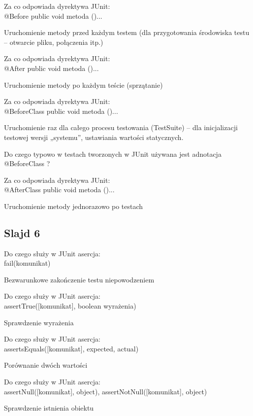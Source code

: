 \documentclass[a4paper,15pt]{article}
\newcommand{\question}[2]{
    \begin{tcolorbox}[colback=mRed!5!white,colframe=mRed,title={Kolokwium 2018 #1}]
        #2
    \end{tcolorbox}
}
\begin{document}
\begin{framed}
Za co odpowiada dyrektywa JUnit: \\
@Before public void metoda ()...
\end{framed}
Uruchomienie metody przed każdym testem (dla przygotowania środowiska testu – otwarcie pliku, połączenia itp.)

\begin{framed}
Za co odpowiada dyrektywa JUnit: \\
@After public void metoda ()...
\end{framed}
Uruchomienie metody po każdym teście (sprzątanie)


\begin{framed}
Za co odpowiada dyrektywa JUnit: \\
@BeforeClass public void metoda ()...
\end{framed}
Uruchomienie raz dla całego procesu testowania (TestSuite) – dla inicjalizacji testowej wersji „systemu”, ustawiania wartości statycznych.
\question{}{
Do czego typowo w testach tworzonych w JUnit używana jest adnotacja @BeforeClass ?
}

\begin{framed}
Za co odpowiada dyrektywa JUnit: \\
@AfterClass public void metoda ()... 
\end{framed}
Uruchomienie metody jednorazowo po testach


\subsection{Slajd 6}

\begin{framed}
Do czego służy w JUnit asercja: \\
fail(komunikat)
\end{framed}
Bezwarunkowe zakończenie testu niepowodzeniem

\begin{framed}
Do czego służy w JUnit asercja: \\
assertTrue($[$komunikat$]$, boolean wyrażenia)
\end{framed}
Sprawdzenie wyrażenia

\begin{framed}
Do czego służy w JUnit asercja: \\
assertsEquals($[$komunikat$]$, expected, actual) 
\end{framed}
Porównanie dwóch wartości

\begin{framed}
Do czego służy w JUnit asercja: \\
assertNull([komunikat], object), assertNotNull([komunikat], object)
\end{framed}
Sprawdzenie istnienia obiektu 
\end{document}
